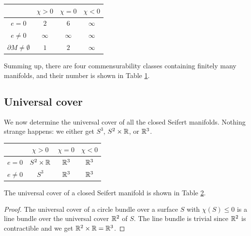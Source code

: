 \begin{table}
\begin{center}
\begin{tabular}{c||ccc}
       & \phantom{\Big|} $\chi>0$ & $\chi = 0$ & $\chi<0$ \\
 \hline \hline
 $e=0$ & \phantom{\Big|} $2$ & $6$ & $\infty$ \\
 $e\neq 0$ & \phantom{\big|} $\infty$ & $\infty$ & $\infty$ \\
 $\partial M \neq \emptyset$  & \phantom{\Big|} $1$ & $2$ & $\infty$
\end{tabular}
\vspace{.2 cm}
\label{finite:table}
\end{center}
\end{table}

Summing up, there are four commensurability classes containing finitely many manifolds, and their number is shown in Table \ref{finite:table}.

\subsection{Universal cover}
We now determine the universal cover of all the closed Seifert manifolds. Nothing strange happens: we either get $S^3$, $S^2\times \mathbb{R}$, or $\mathbb{R}^3$.

\begin{table}
\begin{center}
\begin{tabular}{c||ccc}
       & \phantom{\Big|} $\chi>0$ & $\chi = 0$ & $\chi<0$ \\
 \hline \hline
 $e=0$ & \phantom{\Big|} $S^2 \times \mathbb{R}$ & $\mathbb{R}^3$ & $\mathbb{R}^3$ \\
 $e\neq 0$ & \phantom{\big|} $S^3$ & $\mathbb{R}^3$ & $\mathbb{R}^3$
\end{tabular}
\vspace{.2 cm}
\label{universal:table}
\end{center}
\end{table}

\begin{prop} \label{universal:Seifert:prop}
The universal cover of a closed Seifert manifold is shown in Table \ref{universal:table}.
\end{prop}
\begin{proof}
The universal cover of a circle bundle over a surface $S$ with $\chi(S)\leqslant 0$
is a line bundle over the universal cover $\mathbb{R}^2$ of $S$. The line bundle is trivial since $\mathbb{R}^2$ is contractible and we get $\mathbb{R}^2\times \mathbb{R} = \mathbb{R}^3$.
\end{proof}

